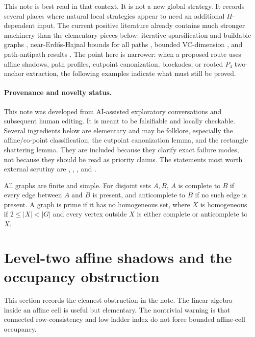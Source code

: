 This note is best read in that context. It is not a new global strategy. It records several places where natural local strategies appear to need an additional $H$-dependent input. The current positive literature already contains much stronger machinery than the elementary pieces below: iterative sparsification and buildable graphs \cite{NguyenScottSeymour2023DensityIV}, near-Erd\H{o}s-Hajnal bounds for all paths \cite{NguyenScottSeymour2023DensityV}, bounded VC-dimension \cite{NguyenScottSeymour2025DensityVI}, and path-antipath results \cite{BousquetLagoutteThomasse2015}. The point here is narrower: when a proposed route uses affine shadows, path profiles, cutpoint canonization, blockades, or rooted $P_4$ two-anchor extraction, the following examples indicate what must still be proved.

\paragraph{Provenance and novelty status.} This note was developed from AI-assisted exploratory conversations and subsequent human editing. It is meant to be falsifiable and locally checkable. Several ingredients below are elementary and may be folklore, especially the affine/co-point classification, the cutpoint canonization lemma, and the rectangle shattering lemma. They are included because they clarify exact failure modes, not because they should be read as priority claims. The statements most worth external scrutiny are , , , and .

All graphs are finite and simple. For disjoint sets $A,B$, $A$ is complete to $B$ if every edge between $A$ and $B$ is present, and anticomplete to $B$ if no such edge is present. A graph is prime if it has no homogeneous set, where $X$ is homogeneous if $2\le |X|<|G|$ and every vertex outside $X$ is either complete or anticomplete to $X$.

\section{Level-two affine shadows and the occupancy obstruction}

This section records the cleanest obstruction in the note. The linear algebra inside an affine cell is useful but elementary. The nontrivial warning is that connected row-consistency and low ladder index do not force bounded affine-cell occupancy.

